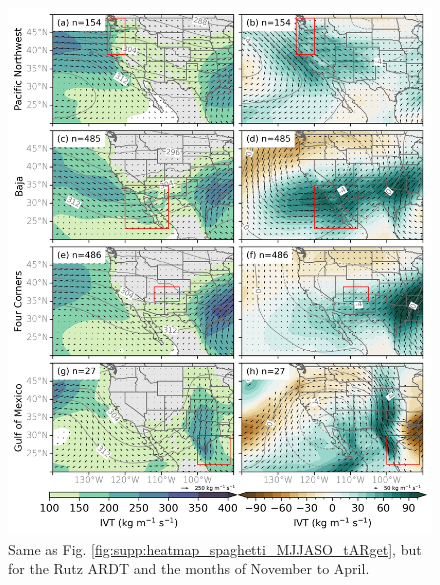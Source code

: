 \documentclass[draft,jgrga]{agutexSI2019}
\begin{document}
\begin{article}
\begin{figure}
\noindent\includegraphics[scale=0.8]{figS5.png}
\caption{Same as Fig. \ref{fig:supp:heatmap_spaghetti_MJJASO_tARget}, but for the Rutz ARDT and the months of November to April.}
\label{fig:supp:heatmap_spaghetti_NDJFMA_Rutz}
\end{figure}


\end{article}
\end{document}
